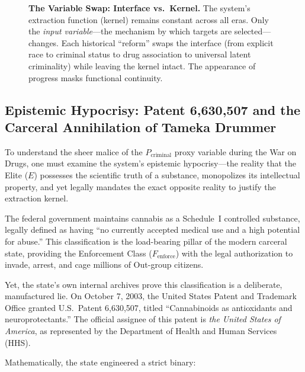 \documentclass[12pt,openany]{book}
\begin{document}
\begin{figure}[htbp]
\caption{\textbf{The Variable Swap: Interface vs.\ Kernel.} The system's extraction function (kernel) remains constant across all eras. Only the \textit{input variable}---the mechanism by which targets are selected---changes. Each historical ``reform'' swaps the interface (from explicit race to criminal status to drug association to universal latent criminality) while leaving the kernel intact. The appearance of progress masks functional continuity.}
\label{fig:variable_swap}
\end{figure}

\subsection{Epistemic Hypocrisy: Patent 6,630,507 and the Carceral Annihilation of Tameka Drummer}

To understand the sheer malice of the $P_{\text{criminal}}$ proxy variable during the War on Drugs, one must examine the system's epistemic hypocrisy---the reality that the Elite ($E$) possesses the scientific truth of a substance, monopolizes its intellectual property, and yet legally mandates the exact opposite reality to justify the extraction kernel.

The federal government maintains cannabis as a Schedule~I controlled substance, legally defined as having ``no currently accepted medical use and a high potential for abuse.'' This classification is the load-bearing pillar of the modern carceral state, providing the Enforcement Class ($F_{\text{enforce}}$) with the legal authorization to invade, arrest, and cage millions of Out-group citizens.

Yet, the state's own internal archives prove this classification is a deliberate, manufactured lie. On October 7, 2003, the United States Patent and Trademark Office granted U.S.\ Patent 6,630,507, titled ``Cannabinoids as antioxidants and neuroprotectants.'' The official assignee of this patent is \textit{the United States of America}, as represented by the Department of Health and Human Services (HHS).

Mathematically, the state engineered a strict binary:
\end{document}
